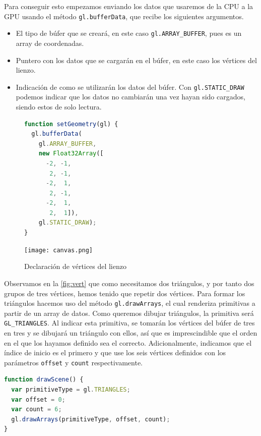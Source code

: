Para conseguir esto empezamos enviando los datos que usaremos de la CPU a la GPU usando el método \texttt{gl.bufferData}, que recibe los siguientes argumentos.
\begin{itemize}
  \item El tipo de búfer que se creará, en este caso \texttt{gl.ARRAY\_BUFFER}, pues es un array de coordenadas.
  \item Puntero con los datos que se cargarán en el búfer, en este caso los vértices del lienzo.
  \item Indicación de como se utilizarán los datos del búfer. Con \texttt{gl.STATIC\_DRAW} podemos indicar que los datos no cambiarán una vez hayan sido cargados, siendo estos de solo lectura.
\end{itemize}
\begin{figure}[ht!]\label{fig:vert}
    \centering
    \begin{minipage}{0.50\textwidth}
        \begin{lstlisting}[language=JavaScript]
function setGeometry(gl) {
  gl.bufferData(
    gl.ARRAY_BUFFER,
    new Float32Array([
      -2, -1,
       2, -1,
      -2,  1,
       2, -1,
      -2,  1,
       2,  1]),
    gl.STATIC_DRAW);
}
\end{lstlisting}
    \end{minipage}%
    \hfill
    \begin{minipage}{0.40\textwidth}
        \texttt{[image: canvas.png]}
    \end{minipage}
    \caption{Declaración de vértices del lienzo}
    \label{fig:canvas}
\end{figure}
Observamos en la \autoref{fig:vert} que como necesitamos dos triángulos, y por tanto dos grupos de tres vértices, hemos tenido que repetir dos vértices. Para formar los triángulos hacemos uso del método \texttt{gl.drawArrays}, el cual renderiza primitivas a partir de un array de datos. Como queremos dibujar triángulos, la primitiva será \texttt{GL\_TRIANGLES}. Al indicar esta primitiva, se tomarán los vértices del búfer de tres en tres y se dibujará un triángulo con ellos, así que es imprescindible que el orden en el que los hayamos definido sea el correcto. Adicionalmente, indicamos que el índice de inicio es el primero y que use los seis vértices definidos con los parámetros \texttt{offset} y \texttt{count} respectivamente.
\begin{lstlisting}[language=JavaScript]
function drawScene() {
  var primitiveType = gl.TRIANGLES;
  var offset = 0;
  var count = 6;
  gl.drawArrays(primitiveType, offset, count);
}
\end{lstlisting}
